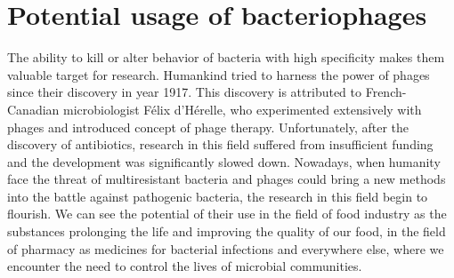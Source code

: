 \section{Potential usage of bacteriophages}
The ability to kill or alter behavior of bacteria with high specificity makes them valuable target for research.
Humankind tried to harness the power of phages since their discovery in year 1917.
This discovery is attributed to French-Canadian microbiologist Félix d'Hérelle, who experimented extensively with phages and introduced concept of phage therapy.
Unfortunately, after the discovery of antibiotics, research in this field suffered from insufficient funding and the development was significantly slowed down.
Nowadays, when humanity face the threat of multiresistant bacteria and phages could bring a new methods into the battle against pathogenic bacteria, the research in this field begin to flourish.
We can see the potential of their use in the field of food industry as the substances prolonging the life and improving the quality of our food,
in the field of pharmacy as medicines for bacterial infections and everywhere else, where we encounter the need to control the lives of microbial communities.

